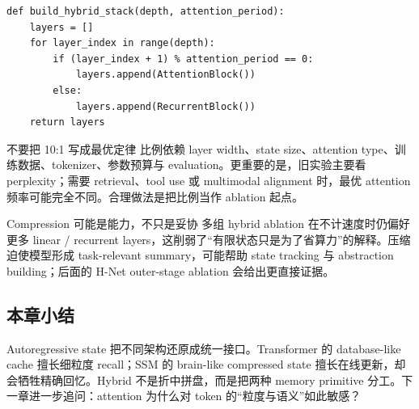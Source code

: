 \begin{lstlisting}[caption={按周期插入 attention 的 hybrid stack 教学伪代码}]
def build_hybrid_stack(depth, attention_period):
    layers = []
    for layer_index in range(depth):
        if (layer_index + 1) % attention_period == 0:
            layers.append(AttentionBlock())
        else:
            layers.append(RecurrentBlock())
    return layers
\end{lstlisting}


\begin{warningbox}{不要把 10:1 写成最优定律}
比例依赖 layer width、state size、attention type、训练数据、tokenizer、参数预算与 evaluation。更重要的是，旧实验主要看 perplexity；需要 retrieval、tool use 或 multimodal alignment 时，最优 attention 频率可能完全不同。合理做法是把比例当作 ablation 起点。
\end{warningbox}

\begin{importantbox}{Compression 可能是能力，不只是妥协}
多组 hybrid ablation 在不计速度时仍偏好更多 linear / recurrent layers，这削弱了“有限状态只是为了省算力”的解释。压缩迫使模型形成 task-relevant summary，可能帮助 state tracking 与 abstraction building；后面的 H-Net outer-stage ablation 会给出更直接证据。
\end{importantbox}

\subsection{本章小结}

Autoregressive state 把不同架构还原成统一接口。Transformer 的 database-like cache 擅长细粒度 recall；SSM 的 brain-like compressed state 擅长在线更新，却会牺牲精确回忆。Hybrid 不是折中拼盘，而是把两种 memory primitive 分工。下一章进一步追问：attention 为什么对 token 的“粒度与语义”如此敏感？

